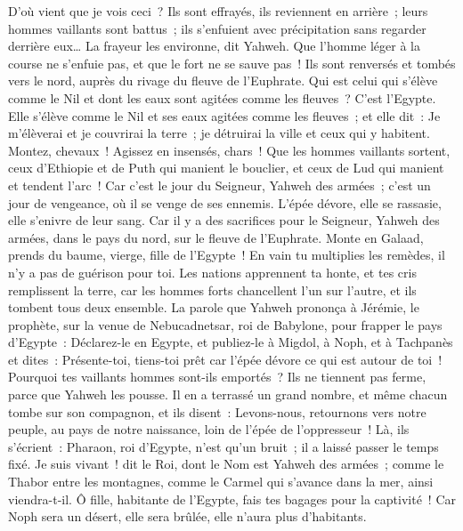 \begin{multicols}{2}
D'où vient que je vois ceci~? Ils sont effrayés, ils reviennent en arrière~; leurs hommes vaillants sont battus~; ils s'enfuient avec précipitation sans regarder derrière eux… La frayeur les environne, dit Yahweh.
Que l'homme léger à la course ne s'enfuie pas, et que le fort ne se sauve pas~! Ils sont renversés et tombés vers le nord, auprès du rivage du fleuve de l'Euphrate.
Qui est celui qui s'élève comme le Nil et dont les eaux sont agitées comme les fleuves~?
C'est l'Egypte. Elle s'élève comme le Nil et ses eaux agitées comme les fleuves~; et elle dit~: Je m'élèverai et je couvrirai la terre~; je détruirai la ville et ceux qui y habitent.
Montez, chevaux~! Agissez en insensés, chars~! Que les hommes vaillants sortent, ceux d'Ethiopie et de Puth qui manient le bouclier, et ceux de Lud qui manient et tendent l'arc~!
Car c'est le jour du Seigneur, Yahweh des armées~; c'est un jour de vengeance, où il se venge de ses ennemis. L'épée dévore, elle se rassasie, elle s'enivre de leur sang. Car il y a des sacrifices pour le Seigneur, Yahweh des armées, dans le pays du nord, sur le fleuve de l'Euphrate.
Monte en Galaad, prends du baume, vierge, fille de l'Egypte~! En vain tu multiplies les remèdes, il n'y a pas de guérison pour toi.
Les nations apprennent ta honte, et tes cris remplissent la terre, car les hommes forts chancellent l'un sur l'autre, et ils tombent tous deux ensemble.
La parole que Yahweh prononça à Jérémie, le prophète, sur la venue de Nebucadnetsar, roi de Babylone, pour frapper le pays d'Egypte~:
Déclarez-le en Egypte, et publiez-le à Migdol, à Noph, et à Tachpanès et dites~: Présente-toi, tiens-toi prêt car l'épée dévore ce qui est autour de toi~!
Pourquoi tes vaillants hommes sont-ils emportés~? Ils ne tiennent pas ferme, parce que Yahweh les pousse.
Il en a terrassé un grand nombre, et même chacun tombe sur son compagnon, et ils disent~: Levons-nous, retournons vers notre peuple, au pays de notre naissance, loin de l'épée de l'oppresseur~!
Là, ils s'écrient~: Pharaon, roi d'Egypte, n'est qu'un bruit~; il a laissé passer le temps fixé.
Je suis vivant~! dit le Roi, dont le Nom est Yahweh des armées~; comme le Thabor entre les montagnes, comme le Carmel qui s'avance dans la mer, ainsi viendra-t-il.
Ô fille, habitante de l'Egypte, fais tes bagages pour la captivité~! Car Noph sera un désert, elle sera brûlée, elle n'aura plus d'habitants.

\end{multicols}
